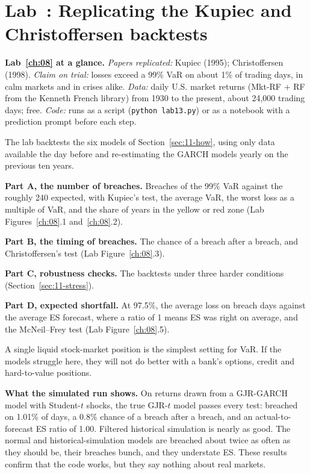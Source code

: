 \section{Lab~\thechapter: Replicating the Kupiec and Christoffersen backtests}
\label{sec:11-lab}

\begin{callout}
\textbf{Lab~\ref{ch:08} at a glance.} \emph{Papers replicated:} Kupiec (1995); Christoffersen (1998). \emph{Claim on trial:} losses exceed a 99\% VaR on about 1\% of trading days, in calm markets and in crises alike. \emph{Data:} daily U.S. market returns (Mkt-RF + RF from the Kenneth French library) from 1930 to the present, about 24,000 trading days; free. \emph{Code:} runs as a script (\texttt{python lab13.py}) or as a notebook with a prediction prompt before each step.
\end{callout}

The lab backtests the six models of Section~\ref{sec:11-how}, using only data available the day before and re-estimating the GARCH models yearly on the previous ten years.

\textbf{Part A, the number of breaches.} Breaches of the 99\% VaR against the roughly 240 expected, with Kupiec's test, the average VaR, the worst loss as a multiple of VaR, and the share of years in the yellow or red zone (Lab Figures~\ref{ch:08}.1 and~\ref{ch:08}.2).

\textbf{Part B, the timing of breaches.} The chance of a breach after a breach, and Christoffersen's test (Lab Figure~\ref{ch:08}.3).

\textbf{Part C, robustness checks.} The backtests under three harder conditions (Section~\ref{sec:11-stress}).

\textbf{Part D, expected shortfall.} At 97.5\%, the average loss on breach days against the average ES forecast, where a ratio of 1 means ES was right on average, and the McNeil--Frey test (Lab Figure~\ref{ch:08}.5).

A single liquid stock-market position is the simplest setting for VaR. If the models struggle here, they will not do better with a bank's options, credit and hard-to-value positions.

\textbf{What the simulated run shows.} On returns drawn from a GJR-GARCH model with Student-$t$ shocks, the true GJR-$t$ model passes every test: breached on 1.01\% of days, a 0.8\% chance of a breach after a breach, and an actual-to-forecast ES ratio of 1.00. Filtered historical simulation is nearly as good. The normal and historical-simulation models are breached about twice as often as they should be, their breaches bunch, and they understate ES. These results confirm that the code works, but they say nothing about real markets.

